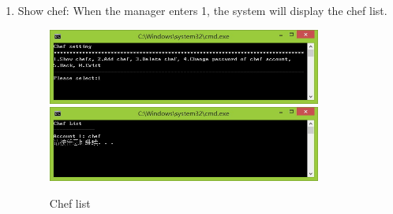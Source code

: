 \documentclass{article}
\begin{document}
\begin{enumerate}
    \item Show chef:\newline 
    When the manager enters 1, the system will display the chef list.
        \begin{figure}[H]
        \centering
        \includegraphics[width=0.85\textwidth]{B/B1a.jpg}
        \includegraphics[width=0.85\textwidth]{B/B1b.jpg}
        \caption{Chef list}
        \end{figure}
    

\end{enumerate}
\end{document}
